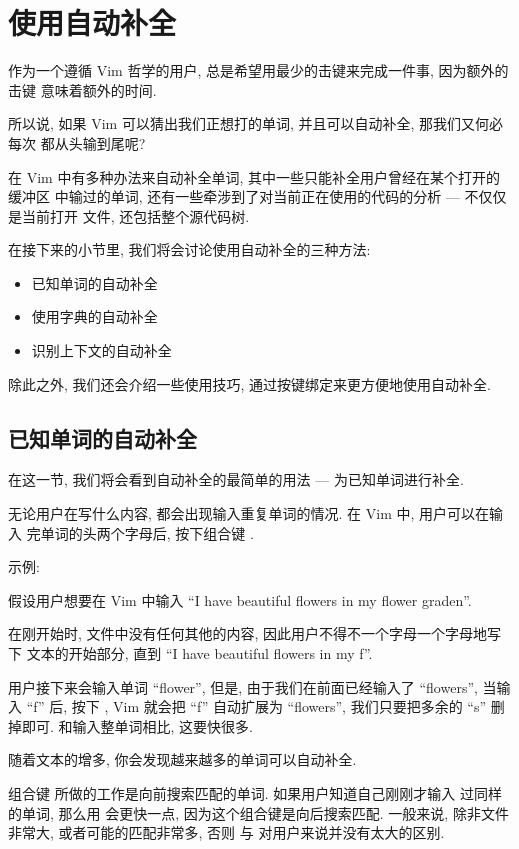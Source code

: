 \section{使用自动补全}
\label{sec:using_autocompletion}

作为一个遵循 Vim 哲学的用户, 总是希望用最少的击键来完成一件事, 因为额外的击键
意味着额外的时间.

所以说, 如果 Vim 可以猜出我们正想打的单词, 并且可以自动补全, 那我们又何必每次
都从头输到尾呢?

在 Vim 中有多种办法来自动补全单词, 其中一些只能补全用户曾经在某个打开的缓冲区
中输过的单词, 还有一些牵涉到了对当前正在使用的代码的分析 --- 不仅仅是当前打开
文件, 还包括整个源代码树.

在接下来的小节里, 我们将会讨论使用自动补全的三种方法:
\begin{itemize}
    \item 已知单词的自动补全
    \item 使用字典的自动补全
    \item 识别上下文的自动补全
\end{itemize}
除此之外, 我们还会介绍一些使用技巧, 通过按键绑定来更方便地使用自动补全.

\subsection{已知单词的自动补全}
\label{subsec:autocompletion_with_known_words}

在这一节, 我们将会看到自动补全的最简单的用法 --- 为已知单词进行补全.

无论用户在写什么内容, 都会出现输入重复单词的情况. 在 Vim 中, 用户可以在输入
完单词的头两个字母后, 按下组合键 .

示例:

假设用户想要在 Vim 中输入 ``I have beautiful flowers in my flower graden''.

在刚开始时, 文件中没有任何其他的内容, 因此用户不得不一个字母一个字母地写下
文本的开始部分, 直到 ``I have beautiful flowers in my f''.

用户接下来会输入单词 ``flower'', 但是, 由于我们在前面已经输入了 ``flowers'',
当输入 ``f'' 后, 按下 , Vim 就会把 ``f'' 自动扩展为 ``flowers'',
我们只要把多余的 ``s'' 删掉即可. 和输入整单词相比, 这要快很多.

随着文本的增多, 你会发现越来越多的单词可以自动补全.

组合键  所做的工作是向前搜索匹配的单词. 如果用户知道自己刚刚才输入
过同样的单词, 那么用  会更快一点, 因为这个组合键是向后搜索匹配.
一般来说, 除非文件非常大, 或者可能的匹配非常多, 否则  与
 对用户来说并没有太大的区别.

